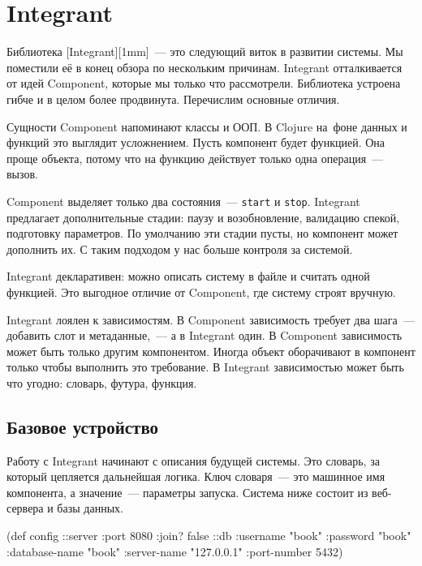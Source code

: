 \section{Integrant}


Библиотека [Integrant][1mm]~--- это
следующий виток в развитии системы. Мы поместили её в конец обзора по нескольким
причинам. Integrant отталкивается от идей Component, которые мы только что
рассмотрели. Библиотека устроена гибче и в целом более продвинута. Перечислим
основные отличия.


Сущности Component напоминают классы и ООП. В Clojure на~фоне данных и функций
это выглядит усложнением. Пусть компонент будет функцией. Она проще объекта,
потому что на функцию действует только одна операция~--- вызов.

Component выделяет только два состояния~--- \verb|start| и
\verb|stop|. Integrant предлагает дополнительные стадии: паузу и
возобновление, валидацию спекой, подготовку параметров. По умолчанию эти стадии
пусты, но компонент может дополнить их. С таким подходом у нас больше контроля
за системой.


Integrant декларативен: можно описать систему в файле и считать одной
функцией. Это выгодное отличие от Component, где систему строят вручную.

Integrant лоялен к зависимостям. В Component зависимость требует два шага~---
добавить слот и метаданные,~--- а в Integrant один. В Component зависимость
может быть только другим компонентом. Иногда объект оборачивают в компонент
только чтобы выполнить это требование. В Integrant зависимостью может быть что
угодно: словарь, футура, функция.

\subsection{Базовое устройство}

Работу с Integrant начинают с описания будущей системы. Это словарь, за который
цепляется дальнейшая логика. Ключ словаря~--- это машинное имя компонента, а
значение~--- параметры запуска. Система ниже состоит из веб-сервера и базы
данных.

\begin{english}
  \begin{clojure}
(def config
  {::server {:port 8080 :join? false}
   ::db {:username      "book"
         :password      "book"
         :database-name "book"
         :server-name   "127.0.0.1"
         :port-number   5432}})
  \end{clojure}
\end{english}

